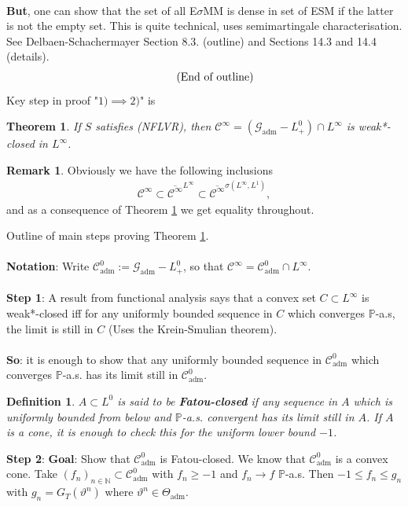 \documentclass[12pt,a4paper, twoside]{article}
\newtheorem{thm}{Theorem}[section]
\newtheorem{defn}{Definition}[section]
\theoremstyle{definition}
\newtheorem{rem}{Remark}[section]
\newcommand{\PP}{\mathbb{P}} %
\begin{document}
\\
\textbf{But}, one can show that the set of all E$\sigma$MM is dense in set of ESM if the latter is not the empty set. This is quite technical, uses semimartingale characterisation. See Delbaen-Schachermayer Section 8.3. (outline) and Sections 14.3 and 14.4 (details). 
\begin{align*}
\tag{\text{End of outline}}
\end{align*}
\newpage
Key step in proof "$1)\implies 2)$" is
\begin{thm} \label{T46} If $S$ satisfies (NFLVR), then $\mathcal{C}^\infty = ( \mathcal{G}_\text{adm}-L_+^0) \cap L^\infty$ is weak*-closed in $L^\infty$. 
\end{thm}
\begin{rem}Obviously we have the following inclusions 
\begin{align*}
\mathcal{C}^\infty \subset \overline{\mathcal{C}^\infty}^{L^\infty} \subset \overline{\mathcal{C}^\infty}^{ \sigma( L^\infty, L^1)},
\end{align*}
and as a consequence of Theorem \ref{T46} we get equality throughout. 
\end{rem}
Outline of main steps proving Theorem \ref{T46}.
\\\\
\textbf{Notation}: Write $\mathcal{C}_\text{adm}^0 := \mathcal{G}_\text{adm}-L_+^0$, so that $\mathcal{C}^\infty = \mathcal{C}_\text{adm}^0 \cap L^\infty$. \\
\\
\textbf{Step 1}: A result from functional analysis says that a convex set $C \subset L^\infty$ is weak*-closed iff for any uniformly bounded sequence in $C$ which converges $\PP$-a.s, the limit is still in $C$ (Uses the Krein-Smulian theorem).
\\\\
\textbf{So}: it is enough to show that any uniformly bounded sequence in $\mathcal{C}_\text{adm}^0$ which converges $\PP$-a.s. has its limit still in $\mathcal{C}_\text{adm}^0.$
\begin{defn} $A \subset L^0$ is said to be \textbf{Fatou-closed} if any sequence in $A$ which is uniformly bounded from below and $\PP$-a.s. convergent has its limit still in $A$. If $A$ is a cone, it is enough to check this for the uniform lower bound $-1$. 
\end{defn}
\noindent \textbf{Step 2}: \textbf{Goal}: Show that $\mathcal{C}_\text{adm}^0$ is Fatou-closed.  We know that $\mathcal{C}_\text{adm}^0$ is a convex cone. Take $(f_n)_{n \in \mathbb{N}} \subset \mathcal{C}_\text{adm}^0$ with $f_n \geq -1$ and $f_n \to f$ $\PP$-a.s. Then $-1 \leq f_n \leq g_n$ with $g_n = G_T( \vartheta^n)$ where $\vartheta^n \in \Theta_\text{adm}$. \\
\end{document}
